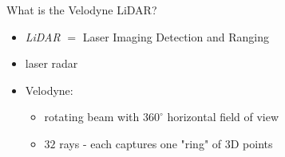 \documentclass[pdf]{beamer}
\begin{document}
	\begin{frame}{What is the Velodyne LiDAR?}
		\begin{itemize}
			\item \emph{LiDAR} $=$ Laser Imaging Detection and Ranging
			\item laser radar
			\item Velodyne:
			\begin{itemize}
				\item rotating beam with $360^{\circ}$ horizontal field of view 				
				\item $32$ rays - each captures one "ring" of $3$D points
			\end{itemize}
		\end{itemize}	
		\begin{figure}[h]
			\center
			\quad
			\quad
		\end{figure}
	\end{frame}
\end{document}
